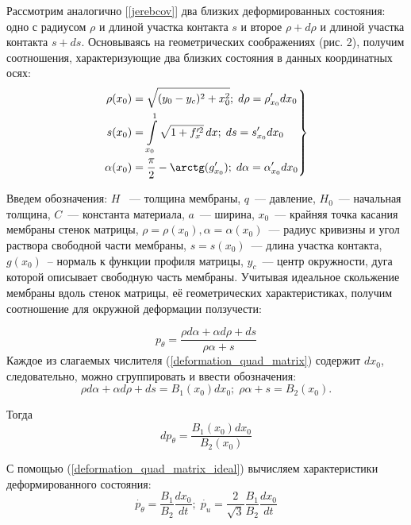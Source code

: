 	
Рассмотрим аналогично [\ref{jerebcov}] два близких деформированных состояния:
одно  с радиусом $\rho$ и длиной участка контакта $s$ и второе $\rho+d\rho$ и длиной участка контакта $s+ds$. Основываясь на геометрических соображениях (рис. 2), получим соотношения, характеризующие два близких состояния в данных координатных осях:
\begin{eqnarray}
\left. 
\begin{split}
\rho(x_0) &= \sqrt{(y_0-y_c)^2 + x_0^2};\; d\rho = \rho'_{x_0}dx_0\\
s(x_0) &= \int\limits^1_{x_0}\sqrt{1+f_x'^2}\,dx; \; ds = s'_{x_0}dx_0\\
\alpha(x_0)&= \dfrac{\pi}{2} - \arctg(g'_{x_0});\; d\alpha = \alpha'_{x_0}dx_0
\end{split}
\right\}
\end{eqnarray}

Введем обозначения: $H$ ~--- толщина мембраны, $q$~--- давление, $H_0$~--- начальная толщина, $C$~---  константа материала, $a$~--- ширина, $x_0$~--- крайняя точка касания мембраны стенок матрицы, $\rho=\rho(x_0), \alpha=\alpha(x_0)$~--- радиус кривизны и угол раствора свободной части мембраны, $s=s(x_0)$~--- длина участка контакта,
$g(x_0)$~-- нормаль к функции профиля матрицы, $y_c$~--- центр окружности, дуга которой описывает свободную часть мембраны. 
Учитывая идеальное скольжение мембраны вдоль стенок матрицы, её геометрических характеристиках, получим соотношение для окружной деформации ползучести:

\begin{equation}
p_\theta = \dfrac{\rho d\alpha +\alpha d\rho+ds}{\rho\alpha+s}
\label{deformation_quad_matrix}
\end{equation}
Каждое из слагаемых числителя (\ref{deformation_quad_matrix}) содержит $dx_0$, следовательно, можно сгруппировать и ввести обозначения: 
\begin{equation}
\rho d\alpha + \alpha d\rho +ds = B_1(x_0)dx_0;\; \rho\alpha+s = B_2(x_0).
\end{equation}

Тогда 
\begin{equation}
	dp_\theta = \dfrac{B_1(x_0)dx_0}{B_2(x_0)}
	\label{deformation_quad_matrix_ideal}
\end{equation}
 
 С помощью (\ref{deformation_quad_matrix_ideal}) вычисляем характеристики деформированного состояния:
 \begin{equation}
 \dot{p_\theta} = \dfrac{B_1}{B_2}\dfrac{dx_0}{dt};\;
 \dot{p_u}  = \dfrac{2}{\sqrt3} \dfrac{B_1}{B_2}\dfrac{dx_0}{dt}
 \end{equation}
 
